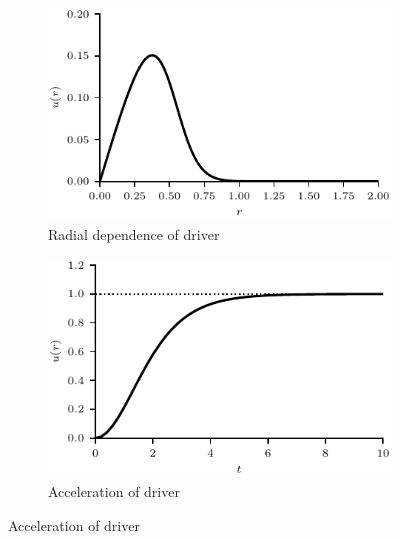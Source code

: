 \begin{figure}[t]
  \centering
  \begin{subfigure}{.49\textwidth}
  \centering
  \includegraphics[width=1.0\linewidth]{u_r.pdf}
  \caption{Radial dependence of driver}
  \label{fig:kink_radial_driver}
  \end{subfigure}
  \begin{subfigure}{.49\textwidth}
  \centering
  \includegraphics[width=1.0\linewidth]{u_t.pdf}
  \caption{Acceleration of driver}
  \label{fig:kink_driver_accel}
  \end{subfigure}
  
  \label{fig:kink_driver}
\end{figure}

